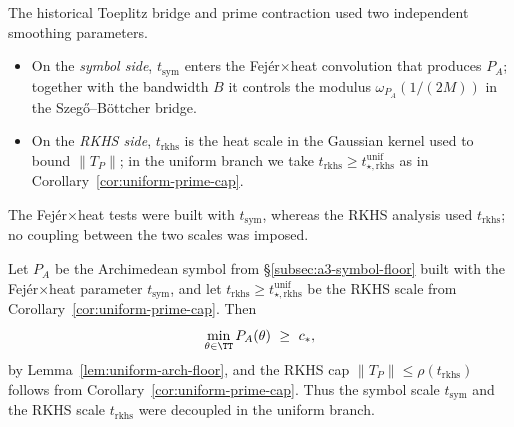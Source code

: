 \begin{remark}
The historical Toeplitz bridge and prime contraction used two independent smoothing parameters.
\begin{itemize}
  \item On the \emph{symbol side}, $t_{\mathrm{sym}}$ enters the Fej\'er$\times$heat
  convolution that produces $P_A$; together with the bandwidth $B$ it controls the
  modulus $\omega_{P_A}(1/(2M))$ in the Szeg\H{o}--B\"ottcher bridge.
  \item On the \emph{RKHS side}, $t_{\mathrm{rkhs}}$ is the heat scale in the Gaussian kernel
  used to bound $\|T_P\|$; in the uniform branch we take $t_{\mathrm{rkhs}}\ge t_{\star,\mathrm{rkhs}}^{\mathrm{unif}}$
  as in Corollary~\ref{cor:uniform-prime-cap}.
\end{itemize}
The Fej\'er$\times$heat tests were built with $t_{\mathrm{sym}}$, whereas the RKHS analysis used
$t_{\mathrm{rkhs}}$; no coupling between the two scales was imposed.
\end{remark}

\begin{lemma}
Let $P_A$ be the Archimedean symbol from \S\ref{subsec:a3-symbol-floor} built with the
Fej\'er$\times$heat parameter $t_{\mathrm{sym}}$, and let $t_{\mathrm{rkhs}}\ge t_{\star,\mathrm{rkhs}}^{\mathrm{unif}}$
be the RKHS scale from Corollary~\ref{cor:uniform-prime-cap}. Then
\[
  \min_{\theta\in\TT} P_A(\theta)\ \ge\ c_*,
\]
by Lemma~\ref{lem:uniform-arch-floor}, and the RKHS cap $\|T_P\|\le\rho(t_{\mathrm{rkhs}})$ follows
from Corollary~\ref{cor:uniform-prime-cap}. Thus the symbol scale $t_{\mathrm{sym}}$ and the
RKHS scale $t_{\mathrm{rkhs}}$ were decoupled in the uniform branch.
\end{lemma}

